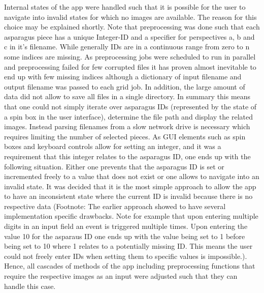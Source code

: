 Internal states of the app were handled such that it is possible for the user to navigate into invalid states for which no images are available. The reason for this choice may be explained shortly. Note that preprocessing was done such that each asparagus piece has a unique Integer-ID and a specifier for perspectives a, b and c in it’s filename. While generally IDs are in a continuous range from zero to n some indices are missing. As preprocessing jobs were scheduled to run in parallel and preprocessing failed for few corrupted files it has proven almost inevitable to end up with few missing indices although a dictionary of input filename and output filename was passed to each grid job. In addition, the large amount of data did not allow to save all files in a single directory. In summary this means that one could not simply iterate over asparagus IDs (represented by the state of a spin box in the user interface), determine the file path and display the related images. Instead parsing filenames from a slow network drive is necessary which requires limiting the number of selected pieces. As GUI elements such as spin boxes and keyboard controls allow for setting an integer, and it was a requirement that this integer relates to the asparagus ID, one ends up with the following situation. Either one prevents that the asparagus ID is set or incremented freely to a value that does not exist or one allows to navigate into an invalid state. It was decided that it is the most simple approach to allow the app to have an inconsistent state where the current ID is invalid because there is no respective data (Footnote: The earlier approach showed to have several implementation specific drawbacks. Note for example that upon entering multiple digits in an input field an event is triggered multiple times. Upon entering the value 10 for the asparaus ID one ends up with the value being set to 1 before being set to 10 where 1 relates to a potentially missing ID. This means the user could not freely enter IDs when setting them to specific values is impossible.). Hence, all cascades of methods of the app including preprocessing functions that require the respective images as an input were adjusted such that they can handle this case. \\


